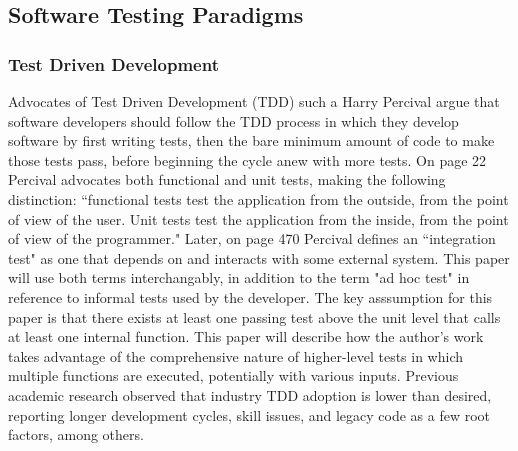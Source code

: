 \documentclass[10pt, conference]{IEEEtran}
\begin{document}
\subsection{Software Testing Paradigms}\label{sec:intro-3}

\subsubsection{Test Driven Development}\label{sec:intro-}
Advocates of Test Driven Development (TDD) such a Harry Percival
 \cite{percival2014test} argue that software developers should
follow the TDD process in which they develop software by first writing tests,
then the bare minimum amount of code to make those tests pass,
before beginning the cycle anew with more tests.
On page 22 \cite{percival2014test} Percival advocates both functional and
 unit tests, making the following distinction:
“functional tests test the application from the outside, from the point of view
of the user. Unit tests test the application from the inside,
from the point of view of the programmer."
Later, on page 470 \cite{percival2014test} Percival defines an “integration test" as
one that depends on and interacts with some external system.
This paper will use both terms interchangably, in addition to the term 
"ad hoc test" in reference to informal tests used by the developer.  
The key asssumption for this paper is that there exists at least one passing 
test above the unit level that calls at least one internal function.  This 
paper will describe how the author's work takes advantage of the 
comprehensive nature of higher-level tests in which multiple functions are 
executed, potentially with various inputs.
Previous academic research \cite{causevic2011factors, ramzan2024test} observed
 that industry TDD adoption is lower than desired,
reporting longer development cycles, skill issues, and legacy code as 
a few root factors, among others.
\end{document}

